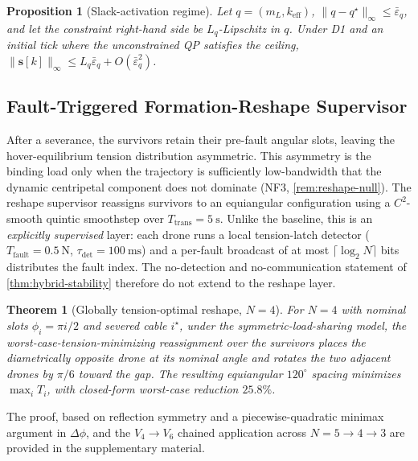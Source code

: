 \documentclass[lettersize,journal]{IEEEtran}
\newtheorem{theorem}{Theorem}%
\newtheorem{proposition}{Proposition}%
\newcommand{\vect}[1]{\boldsymbol{#1}}
\begin{document}
\begin{proposition}[Slack-activation regime]
\label{prop:mpc-slack}
Let $q=(m_L,k_{\mathrm{eff}})$, $\|q-q^\star\|_\infty\le\bar\varepsilon_q$, and let the constraint right-hand side be $L_q$-Lipschitz in $q$. Under D1 and an initial tick where the unconstrained QP satisfies the ceiling, $\|\vect s[k]\|_\infty\le L_q\bar\varepsilon_q + O(\bar\varepsilon_q^2)$.
\end{proposition}

\subsection{Fault-Triggered Formation-Reshape Supervisor}
\label{sec:reshape-supervisor}

After a severance, the survivors retain their pre-fault angular slots, leaving the hover-equilibrium tension distribution asymmetric. This asymmetry is the binding load only when the trajectory is sufficiently low-bandwidth that the dynamic centripetal component does not dominate (NF3, \cref{rem:reshape-null}). The reshape supervisor reassigns survivors to an equiangular configuration using a $ C^2$-smooth quintic smoothstep over $T_{\mathrm{trans}}=\SI{5}{\second}$. Unlike the baseline, this is an \emph{explicitly supervised} layer: each drone runs a local tension-latch detector ($T_{\mathrm{fault}}=\SI{0.5}{\newton}$, $\tau_{\mathrm{det}}=\SI{100}{\milli\second}$) and a per-fault broadcast of at most $\lceil\log_2 N\rceil$ bits distributes the fault index. The no-detection and no-communication statement of \cref{thm:hybrid-stability} therefore do not extend to the reshape layer.

\begin{theorem}[Globally tension-optimal reshape, $N=4$]
\label{thm:reshape}
For $N=4$ with nominal slots $\phi_i=\pi i/2$ and severed cable $i^\star$, under the symmetric-load-sharing model, the worst-case-tension-minimizing reassignment over the survivors places the diametrically opposite drone at its nominal angle and rotates the two adjacent drones by $\pi/6$ toward the gap. The resulting equiangular $120^\circ$ spacing minimizes $\max_i T_i$, with closed-form worst-case reduction $25.8\%$.
\end{theorem}

The proof, based on reflection symmetry and a piecewise-quadratic minimax argument in $\Delta\phi$, and the $V_4\to V_6$ chained application across $N=5\to 4\to 3$ are provided in the supplementary material.
\end{document}
